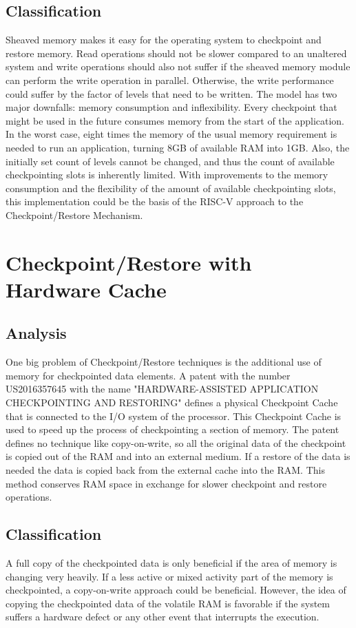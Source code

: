 \subsection{Classification}
Sheaved memory makes it easy for the operating system to checkpoint and
restore memory. Read operations should not be slower compared to an
unaltered system and write operations should also not suffer if
the sheaved memory module can perform the write operation in parallel.
Otherwise, the write performance could suffer by the factor of levels that
need to be written. The model has two major downfalls: 
memory consumption and inflexibility.
Every checkpoint that might be used in the future consumes memory from
the start of the application. In the worst case, eight times the memory
of the usual memory requirement is needed to run an application, turning
8GB of available RAM into 1GB.
Also, the initially set count of levels cannot be changed, and thus
the count of available checkpointing slots is inherently limited.
With improvements to the memory consumption and the flexibility of
the amount of available checkpointing slots, this implementation
could be the basis of the RISC-V approach to the Checkpoint/Restore
Mechanism.

\section{Checkpoint/Restore with Hardware Cache}
\subsection{Analysis}
One big problem of Checkpoint/Restore techniques is the additional
use of memory for checkpointed data elements.
A patent with the number US2016357645
\cite{patent_US20160357645} with the name
"HARDWARE-ASSISTED APPLICATION CHECKPOINTING AND RESTORING"
defines a physical Checkpoint Cache that is connected to the
I/O system of the processor. This Checkpoint Cache is used
to speed up the process of checkpointing a section of memory.
The patent defines no technique like copy-on-write, so all
the original data of the checkpoint is copied out of the RAM
and into an external medium.
If a restore of the data is needed the data is copied back
from the external cache into the RAM.
This method conserves RAM space in exchange for slower
checkpoint and restore operations.

\subsection{Classification}
A full copy of the checkpointed data is only beneficial
if the area of memory is changing very heavily.
If a less active or mixed activity part of the memory
is checkpointed, a copy-on-write approach could be beneficial.
However, the idea of copying the checkpointed data of
the volatile RAM is favorable if the system suffers a
hardware defect or any other event that interrupts the
execution.

